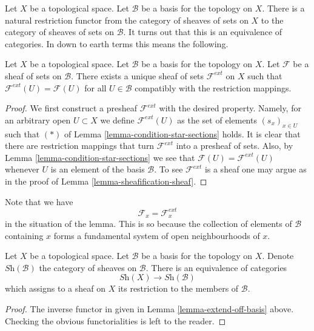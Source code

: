 \noindent
Let $X$ be a topological space.
Let $\mathcal{B}$ be a basis for the topology on $X$.
There is a natural restriction functor from the category
of sheaves of sets on $X$ to the category of sheaves of
sets on $\mathcal{B}$. It turns out that this is an equivalence
of categories. In down to earth terms this means the following.

\begin{lemma}
\label{lemma-extend-off-basis}
Let $X$ be a topological space.
Let $\mathcal{B}$ be a basis for the topology on $X$.
Let $\mathcal{F}$ be a sheaf of sets on $\mathcal{B}$.
There exists a unique sheaf of sets $\mathcal{F}^{ext}$
on $X$ such that $\mathcal{F}^{ext}(U) = \mathcal{F}(U)$
for all $U \in \mathcal{B}$ compatibly with the restriction
mappings.
\end{lemma}

\begin{proof}
We first construct a presheaf $\mathcal{F}^{ext}$ with the
desired property. Namely, for an arbitrary open $U \subset X$ we
define $\mathcal{F}^{ext}(U)$ as the set of elements 
$(s_x)_{x \in U}$ such that $(*)$ of
Lemma \ref{lemma-condition-star-sections} holds.
It is clear that there are restriction mappings
that turn $\mathcal{F}^{ext}$ into a presheaf of sets.
Also, by Lemma \ref{lemma-condition-star-sections} we
see that $\mathcal{F}(U) = \mathcal{F}^{ext}(U)$ 
whenever $U$ is an element of the basis $\mathcal{B}$.
To see $\mathcal{F}^{ext}$ is a sheaf one may
argue as in the proof of Lemma \ref{lemma-sheafification-sheaf}.
\end{proof}

\noindent
Note that we have
$$
\mathcal{F}_x = \mathcal{F}_x^{ext}
$$
in the situation of the lemma. This is so because the
collection of elements of $\mathcal{B}$ containing
$x$ forms a fundamental system of open neighbourhoods of $x$.

\begin{lemma}
\label{lemma-restrict-basis-equivalence}
Let $X$ be a topological space.
Let $\mathcal{B}$ be a basis for the topology on $X$.
Denote $\textit{Sh}(\mathcal{B})$ the category of
sheaves on $\mathcal{B}$.
There is an equivalence of categories
$$
\textit{Sh}(X) \longrightarrow \textit{Sh}(\mathcal{B})
$$
which assigns to a sheaf on $X$ its restriction to
the members of $\mathcal{B}$.
\end{lemma}

\begin{proof}
The inverse functor in given in Lemma \ref{lemma-extend-off-basis} above.
Checking the obvious functorialities is left to the
reader.
\end{proof}


